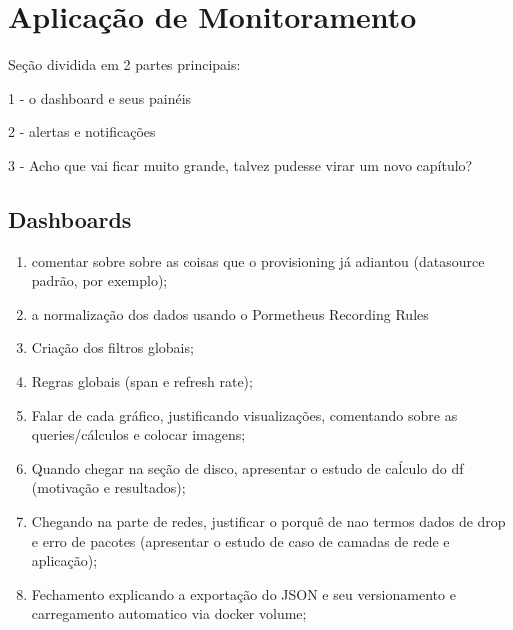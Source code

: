 \chapter{Aplicação de Monitoramento}
\label{chap04}

{\color{blue}
Seção dividida em 2 partes principais:

1 - o dashboard e seus painéis

2 - alertas e notificações

3 - Acho que vai ficar muito grande, talvez pudesse virar um novo capítulo?

\section{Dashboards}
\label{section:Dashboards}

\begin{enumerate}  
  \item comentar sobre sobre as coisas que o provisioning já adiantou (datasource padrão, por exemplo);
  \item a normalização dos dados usando o Pormetheus Recording Rules
  \item Criação dos filtros globais;
  \item Regras globais (span e refresh rate);
  \item Falar de cada gráfico, justificando visualizações, comentando sobre as queries/cálculos e colocar imagens;
  \item Quando chegar na seção de disco, apresentar o estudo de caĺculo do df (motivação e resultados);
  \item Chegando na parte de redes, justificar o porquê de nao termos dados de drop e erro de pacotes (apresentar o estudo de caso de camadas de rede e aplicação);
  \item Fechamento explicando a exportação do JSON e seu versionamento e carregamento automatico via docker volume;
\end{enumerate}


}
